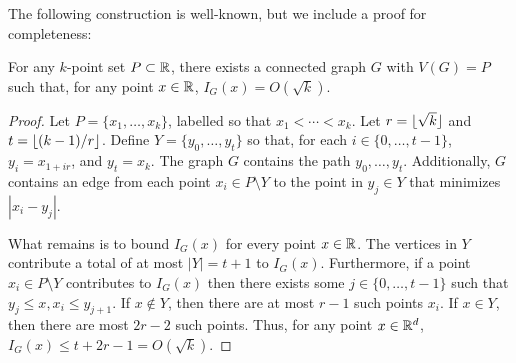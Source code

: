 \documentclass{patmorin}
\begin{document}
The following construction is well-known, but we include a proof for completeness:

\begin{lem}
  For any $k$-point set $P\subset\mathbb{R}$, there exists a connected graph $G$ with $V(G)=P$ such that, for any point $x\in\mathbb{R}$, $I_G(x) = O(\sqrt{k})$.
\end{lem}

\begin{proof}
  Let $P=\{x_1,\ldots,x_k\}$, labelled so that $x_1<\cdots< x_k$.  Let $r={\lfloor \sqrt{k} \rfloor}$ and $t={\lfloor (k-1)/r \rfloor}$.
  Define $Y=\{y_0,\ldots,y_t\}$ so that, for each $i\in\{0,\ldots,t-1\}$, $y_i=x_{1+ir}$, and $y_t=x_k$.  The graph $G$ contains the path $y_0,\ldots,y_t$.  Additionally, $G$ contains an edge from each point $x_i\in P\setminus Y$ to the point in $y_j\in Y$ that minimizes $|x_i-y_j|$.
  
  What remains is to bound $I_G(x)$ for every point $x\in\mathbb{R}$.  The vertices in $Y$ contribute a total of at most $|Y|=t+1$ to $I_G(x)$.  Furthermore, if a point $x_i\in P\setminus Y$ contributes to $I_G(x)$ then there exists some $j\in\{0,\ldots,t-1\}$ such that $y_j \le x,x_i\le y_{j+1}$.  If $x\not\in Y$, then there are at most $r-1$ such points $x_i$. If $x\in Y$, then there are most $2r-2$ such points.  Thus, for any point $x\in\mathbb{R}^d$, $I_G(x)\le t + 2r -1 = O(\sqrt{k})$. 
\end{proof}

% 
% 
% 
\end{document}

